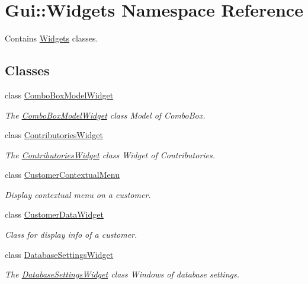 \hypertarget{namespaceGui_1_1Widgets}{}\section{Gui\+:\+:Widgets Namespace Reference}
\label{namespaceGui_1_1Widgets}


Contains \hyperlink{namespaceGui_1_1Widgets}{Widgets} classes.  


\subsection*{Classes}
\begin{DoxyCompactItemize}
\item 
class \hyperlink{classGui_1_1Widgets_1_1ComboBoxModelWidget}{Combo\+Box\+Model\+Widget}
\begin{DoxyCompactList}\small\item\em The \hyperlink{classGui_1_1Widgets_1_1ComboBoxModelWidget}{Combo\+Box\+Model\+Widget} class Model of Combo\+Box. \end{DoxyCompactList}\item 
class \hyperlink{classGui_1_1Widgets_1_1ContributoriesWidget}{Contributories\+Widget}
\begin{DoxyCompactList}\small\item\em The \hyperlink{classGui_1_1Widgets_1_1ContributoriesWidget}{Contributories\+Widget} class Widget of Contributories. \end{DoxyCompactList}\item 
class \hyperlink{classGui_1_1Widgets_1_1CustomerContextualMenu}{Customer\+Contextual\+Menu}
\begin{DoxyCompactList}\small\item\em Display contextual menu on a customer. \end{DoxyCompactList}\item 
class \hyperlink{classGui_1_1Widgets_1_1CustomerDataWidget}{Customer\+Data\+Widget}
\begin{DoxyCompactList}\small\item\em Class for display info of a customer. \end{DoxyCompactList}\item 
class \hyperlink{classGui_1_1Widgets_1_1DatabaseSettingsWidget}{Database\+Settings\+Widget}
\begin{DoxyCompactList}\small\item\em The \hyperlink{classGui_1_1Widgets_1_1DatabaseSettingsWidget}{Database\+Settings\+Widget} class Windows of database settings. \end{DoxyCompactList}\item 

\end{DoxyCompactItemize}
